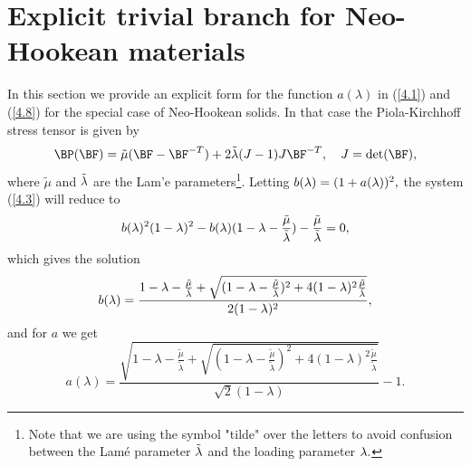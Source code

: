 
\section{Explicit trivial branch for Neo-Hookean materials} 
\setcounter{equation}{0}

In this section we provide an explicit form for the function $a(\lambda)$ in (\ref{4.1}) and (\ref{4.8}) for the special case of Neo-Hookean solids. 
In that case the Piola-Kirchhoff stress tensor is given by  
$$\BP(\BF)=\tilde \mu(\BF-\BF^{-T})+ 2\tilde{\lambda}(J-1)J\BF^{-T},\quad J=\det(\BF),$$
where $\tilde \mu$ and $\tilde{\lambda}$ are the Lam'e parameters\footnote{Note that we are using the symbol "tilde" over the letters to avoid confusion between the Lam\'e parameter $\tilde{\lambda}$ and the loading parameter $\lambda.$}. Letting $b(\lambda)=(1+a(\lambda))^2,$ the system (\ref{4.3}) will reduce to 
$$b(\lambda)^2(1-\lambda)^2-b(\lambda)(1-\lambda-\frac{\tilde\mu}{\tilde{\lambda}})-\frac{\tilde\mu}{\tilde{\lambda}}=0,$$
which gives the solution
$$b(\lambda)=\frac{1-\lambda-\frac{\tilde\mu}{\tilde{\lambda}}+\sqrt{(1-\lambda-\frac{\tilde\mu}{\tilde{\lambda}})^2+4(1-\lambda)^2\frac{\tilde\mu}{\tilde{\lambda}}}
}{2(1-\lambda)^2},$$
and for $a$ we get
$$a(\lambda)=\frac{\sqrt{1-\lambda-\frac{\tilde\mu}{\tilde{\lambda}}+\sqrt{(1-\lambda-\frac{\tilde\mu}{\tilde{\lambda}})^2
+4(1-\lambda)^2\frac{\tilde\mu}{\tilde{\lambda}}}}}{\sqrt{2}(1-\lambda)}-1.
$$
